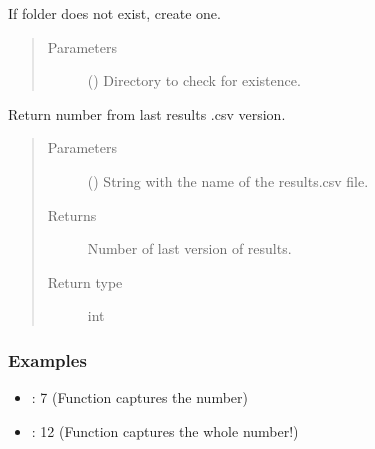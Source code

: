 \documentclass[letterpaper,10pt,english]{sphinxmanual}
\begin{document}
\begin{fulllineitems}
\label{\detokenize{source/optimization.opt_tools:optimization.opt_tools.aux_funcs.folder_exists}}
If folder does not exist, create one.
\begin{quote}\begin{description}
\item[{Parameters}] \leavevmode
{} () \textendash{} Directory to check for existence.

\end{description}\end{quote}

\end{fulllineitems}


\begin{fulllineitems}
\label{\detokenize{source/optimization.opt_tools:optimization.opt_tools.aux_funcs.get_num}}
Return number from last results .csv version.
\begin{quote}\begin{description}
\item[{Parameters}] \leavevmode
{} () \textendash{} String with the name of the results.csv file.

\item[{Returns}] \leavevmode
Number of last version of results.

\item[{Return type}] \leavevmode
int

\end{description}\end{quote}
\subsubsection*{Examples}
\begin{itemize}
\item {} 
: 7 (Function captures the number)

\item {} 
: 12 (Function captures the whole number!)

\end{itemize}

\end{fulllineitems}
\end{document}
